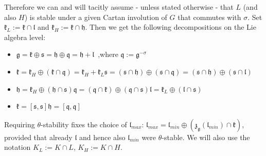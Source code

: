\documentclass[10]{amsart}
\theoremstyle{remark}
\theoremstyle{definition}
\numberwithin{equation}{section}
\newcommand{\fg}{{\mathfrak g}}
\newcommand{\fh}{{\mathfrak h}}
\newcommand{\fk}{{\mathfrak k}}
\newcommand{\fl}{{\mathfrak l}}
\newcommand{\fq}{{\mathfrak q}}
\newcommand{\fs}{{\mathfrak s}}
\newcommand{\fz}{{\mathfrak z}}
\newcommand{\defn}{{:=}}
\begin{document}
{Therefore we can and will tacitly assume - unless stated otherwise - that $L$ (and also $H$) is stable under a given Cartan involution of $G$ that commutes with $\sigma$. Set $\fk_L\defn \fk\cap\fl$ and $\fk_H\defn\fk\cap\fh$.  Then we get the following 
decompositions on the Lie algebra level:
\begin{itemize}
\item[] $\fg=\fk\oplus\fs=\fh\oplus\fq=\fh+\fl$\ ,\quad where $\fq\defn \fg^{-\sigma}$
\item[] $\fk=\fk_H\oplus(\fk\cap\fq)=\fk_H+\fk_L$\hspace*{0.5cm}$\fs=(\fs\cap\fh)\oplus(\fs\cap\fq)=(\fs\cap\fh)\oplus(\fs\cap\fl)$
\item[]$\fh=\fk_H\oplus(\fh\cap\fs)$\hspace*{2.0cm}$\fq=(\fq\cap\fk)\oplus(\fq\cap\fs)$\hspace*{2.0cm}$\fl=\fk_L\oplus(\fl\cap\fs)$
\item[]$\fk=[\fs,\fs]$\hspace*{3.3cm}$\fh=[\fq,\fq]$
\end{itemize}
Requiring $\theta$-stability fixes the choice of $\fl_{max}$: $\fl_{max}=\fl_{min}\oplus (\fz_{\fg}(\fl_{min})\cap\fk)$, provided that already $\fl$ and hence also $\fl_{min}$ were 
$\theta$-stable. We will also use the notation $K_L\defn K\cap L$, $K_H\defn K\cap H$.
%

}
\end{document}
